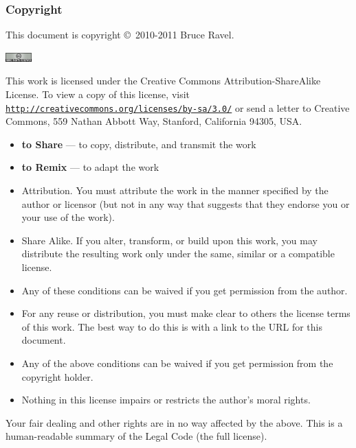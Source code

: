 
\begin{frame}
  \frametitle{Copyright}
  \tiny

  This document is copyright \copyright\ 2010-2011 Bruce Ravel.

  \begin{center}
    \includegraphics[width=1.0cm]{images/somerights20}
  \end{center}

  This work is licensed under the Creative Commons
  Attribution-ShareAlike License.  To view a copy of this license,
  visit \href{http://creativecommons.org/licenses/by-sa/3.0/}
  {\color{Purple4}\texttt{http://creativecommons.org/licenses/by-sa/3.0/}}
  or send a letter to Creative Commons, 559 Nathan Abbott Way,
  Stanford, California 94305, USA.

  \begin{description}
  \tiny
  \item[You are free:] %
    \begin{itemize}
      \tiny
    \item \textbf{to Share} --- to copy, distribute, and transmit the work
    \item \textbf{to Remix} --- to adapt the work
    \end{itemize}
  \item[Under the following conditions:] %
    \begin{itemize}
      \tiny
    \item Attribution. You must attribute the work in the manner
      specified by the author or licensor (but not in any way that
      suggests that they endorse you or your use of the work).
    \item Share Alike. If you alter, transform, or build upon this
      work, you may distribute the resulting work only under the same,
      similar or a compatible license.
    \item Any of these conditions can be waived if you get permission
      from the author.
    \end{itemize}
  \end{description}
  \begin{itemize}
  \tiny
  \item For any reuse or distribution, you must make clear to others
    the license terms of this work. The best way to do this is with a
    link to the URL for this document.
  \item Any of the above conditions can be waived if you get
    permission from the copyright holder.
  \item Nothing in this license impairs or restricts the author's
    moral rights.
  \end{itemize}

  Your fair dealing and other rights are in no way affected by the
  above.  This is a human-readable summary of the Legal Code (the full
  license).


\end{frame}

